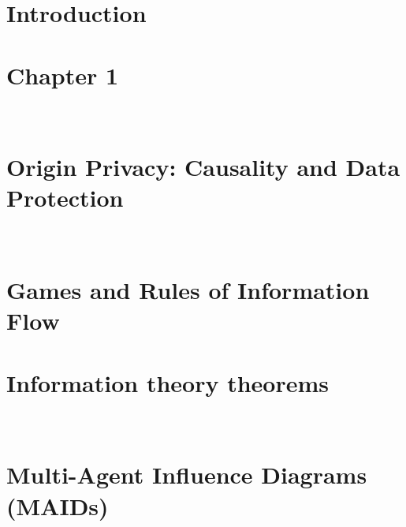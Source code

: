 \documentclass[12pt, oneside]{lib/ucthesis}
\def\ssp{\def\baselinestretch{1.0}\large\normalsize}
\begin{document}
\tableofcontents
\listoffigures 
\listoftables

\begin{acknowledgements}
\thispagestyle{plain}
 
\end{acknowledgements}




\begin{dissertationText}
\chapter{Introduction}
	
\chapter{Chapter 1}~\label{chapter:background}

\chapter{Origin Privacy: Causality and Data Protection}~\label{chapter:background}
	
\chapter[Games and Rules]{Games and Rules of Information Flow}
	

\ssp	%



\appendix
\chapter[DPI Theorems]{Information theory theorems}~\label{appendix:information-theory-theorems}


\chapter[MAIDS]{Multi-Agent Influence Diagrams (MAIDs)}~\label{appendix:maid}
	

\end{dissertationText}
\end{document}
